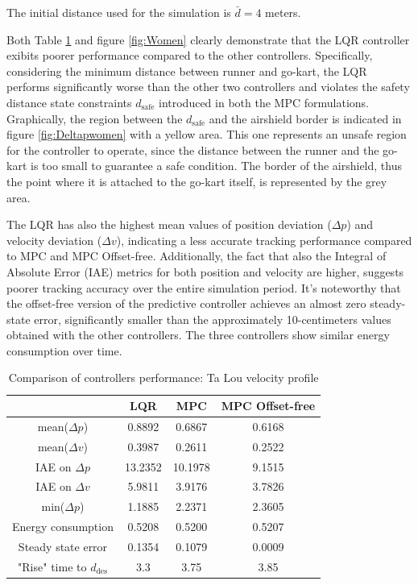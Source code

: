 \documentclass[a4paper,12pt,oneside]{book}
\begin{document}
The initial distance used for the simulation is $\bar{d} = 4$ meters.

\bigskip
Both Table \ref{tab:Ta_Lou} and figure \ref{fig:Women} clearly demonstrate that the LQR controller exibits poorer performance compared to the other controllers.
Specifically, considering the minimum distance between runner and go-kart, the LQR performs significantly worse than the other two controllers and violates the safety distance state constraints $d_{\text{safe}}$ introduced in both the MPC formulations.
Graphically, the region between the $d_\text{safe}$ and the airshield border is indicated in figure \ref{fig:Deltapwomen} with a yellow area.
This one represents an unsafe region for the controller to operate, since the distance between the runner and the go-kart is too small to guarantee a safe condition. 
The border of the airshield, thus the point where it is attached to the go-kart itself, is represented by the grey area.

The LQR has also the highest mean values of position deviation ($\Delta p$) and velocity deviation ($\Delta v$), indicating a less accurate tracking performance compared to MPC and MPC Offset-free.
Additionally, the fact that also the Integral of Absolute Error (IAE) metrics for both position and velocity are higher, suggests poorer tracking accuracy over the entire simulation period.
It's noteworthy that the offset-free version of the predictive controller achieves an almost zero steady-state error, significantly smaller than the approximately 10-centimeters values obtained with the other controllers. 
The three controllers show similar energy consumption over time.

\begin{table}[htbp]
	\centering
	\begin{tabular}{c|c|c|c}
          & \textbf{LQR} & \textbf{MPC} & \textbf{MPC Offset-free} \\
	\hline
	\hline
	mean($\Delta p$) & 0.8892 & 0.6867 &  0.6168 \\
	mean($\Delta v$) & 0.3987 & 0.2611 & 0.2522 \\
	IAE on $\Delta p$ & 13.2352 & 10.1978 & 9.1515 \\
	IAE on $\Delta v$ & 5.9811 & 3.9176 & 3.7826 \\
	min($\Delta p$) & 1.1885 & 2.2371 & 2.3605 \\
	Energy consumption & 0.5208 & 0.5200 & 0.5207 \\
	Steady state error & 0.1354 & 0.1079 & 0.0009 \\
	"Rise" time to $d_\text{des}$ & 3.3 & 3.75 & 3.85 \\
	\hline
	\end{tabular}
\caption{Comparison of controllers performance: Ta Lou velocity profile }
\label{tab:Ta_Lou}
\end{table}
\end{document}
